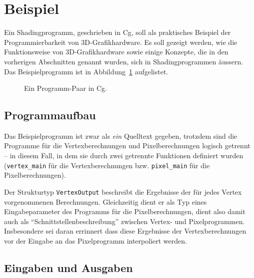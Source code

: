 \documentclass[twoside,a4paper,fleqn,12pt]{book}
\begin{document}
\section{Beispiel}


Ein Shadingprogramm, geschrieben in Cg, soll als praktisches Beispiel der Programmierbarkeit von 3D-Grafikhardware.
Es soll gezeigt werden, wie die Funktionsweise von 3D-Grafikhardware sowie einige Konzepte, die in den vorherigen
Abschnitten genannt wurden, sich in Shadingprogrammen äussern. Das Beispielprogramm ist in Abbildung~\ref{fig:simple_cg} aufgelistet.

\begin{figure}[hp]
  
  \caption{Ein Programm-Paar in Cg.}
  \label{fig:simple_cg}
\end{figure}

\subsection{Programmaufbau}

Das Beispielprogramm ist zwar als \emph{ein} Quelltext gegeben, trotzdem sind die Programme für die Vertexberechnungen
und Pixelberechnungen logisch getrennt -- in diesem Fall, in dem sie durch zwei getrennte Funktionen definiert wurden
(\verb+vertex_main+ für die Vertexberechnungen bzw. \verb+pixel_main+ für die Pixelberechnungen).

Der Strukturtyp \verb+VertexOutput+ beschreibt die Ergebnisse der für jedes Vertex vorgenommenen Berechnungen.
Gleichzeitig dient er als Typ eines Eingabeparameter des Programms für die Pixelberechnungen, dient also damit
auch als "`Schnittstellenbeschreibung"' zwischen Vertex- und Pixelprogrammen. Insbesondere sei daran errinnert
dass diese Ergebnisse der Vertexberechnungen vor der Eingabe an das Pixelprogramm interpoliert werden.

\subsection{Eingaben und Ausgaben}
\end{document}
